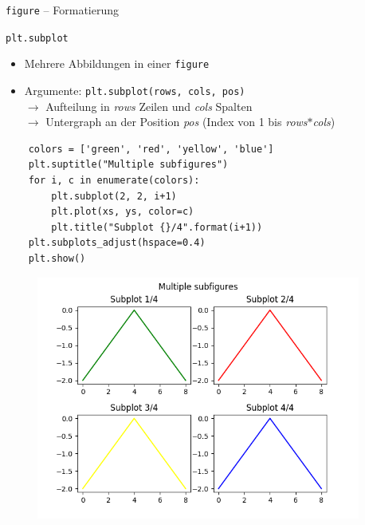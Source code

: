 \documentclass[utf8, smaller, c]{beamer}
\renewcommand{\tt}[1]{{\texttt{#1}}}
\begin{document}
\begin{frame}{\tt{figure} -- Formatierung}
	\vspace*{1mm}
	\begin{block}{\tt{plt.subplot}}
		\begin{itemize}
			\item Mehrere Abbildungen in einer \tt{figure}
			\item Argumente: \tt{plt.subplot(rows, cols, pos)} \\ $\rightarrow$ Aufteilung in \textit{rows} Zeilen und \textit{cols} Spalten\\ $\rightarrow$ Untergraph an der Position \textit{pos} (Index von 1 bis \textit{rows}$*$\textit{cols})
		\end{itemize}
	\end{block}
	\vspace*{-2mm}
	\begin{minipage}{0.48\textwidth}
		\begin{lstlisting}
	colors = ['green', 'red', 'yellow', 'blue']
	plt.suptitle("Multiple subfigures")
	for i, c in enumerate(colors):
    	plt.subplot(2, 2, i+1)
    	plt.plot(xs, ys, color=c)
    	plt.title("Subplot {}/4".format(i+1))
	plt.subplots_adjust(hspace=0.4)
	plt.show()
		\end{lstlisting}
	\end{minipage}
	\begin{minipage}{0.51\textwidth}
		\begin{figure}
			\includegraphics[width=0.95\textwidth]{pics/subplots}
		\end{figure}
	\end{minipage}
\end{frame}
\end{document}
